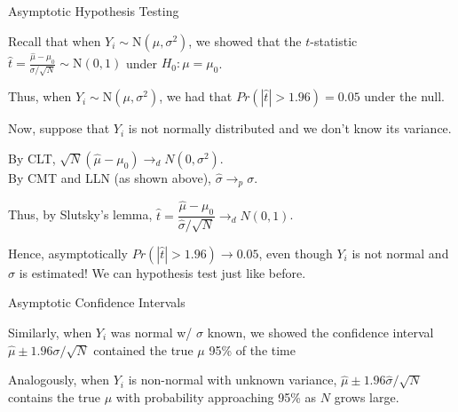 \documentclass[11pt,english,handout]{beamer}
\newenvironment{wideitemize}{\itemize\addtolength{\itemsep}{10pt}}{\enditemize}
\begin{document}
\begin{frame}{Asymptotic Hypothesis Testing}

\begin{wideitemize}
\item
Recall that when $Y_i \sim \mathrm{N}(\mu,\sigma^2)$, we showed that the $t$-statistic $\hat{t} = \frac{\hat\mu - \mu_0}{\sigma / \sqrt{N}} \sim  \mathrm{N}(0,1)$ under $H_0: \mu = \mu_0$.

\pause
\item 
Thus, when $Y_i \sim \mathrm{N}(\mu,\sigma^2)$, we had that $Pr(|\hat t| > 1.96) = 0.05$ under the null.

\pause
\item
Now, suppose that $Y_i$ is not normally distributed and we don't know its variance.

\pause
\item
By CLT, $\sqrt{N} (\hat\mu - \mu_0) \rightarrow_d N(0,\sigma^2)$.\\
By CMT and LLN (as shown above), $\hat\sigma \rightarrow_p \sigma$. 

\pause
\item
Thus, by Slutsky's lemma, $\hat{t} = \dfrac{\hat\mu - \mu_0}{ \hat\sigma /\sqrt{N} } \rightarrow_d N(0,1)$.

\pause
\item
Hence, asymptotically $Pr( |\hat{t}| > 1.96 ) \rightarrow 0.05$, even though $Y_i$ is not normal and $\hat\sigma$ is estimated! We can hypothesis test just like before.

\end{wideitemize}	
	
\end{frame}


\begin{frame}{Asymptotic Confidence Intervals}

\begin{wideitemize}
\item
Similarly, when $Y_i$ was normal w/ $\sigma$ known, we showed the confidence interval $\hat\mu \pm 1.96 \sigma/\sqrt{N}$ contained the true $\mu$ 95\% of the time

\pause
\item
Analogously, when $Y_i$ is non-normal with unknown variance, $\hat\mu \pm 1.96 \hat\sigma/\sqrt{N}$ contains the true $\mu$ with probability approaching 95\% as $N$ grows large.

\end{wideitemize}
	
\end{frame}
\end{document}
